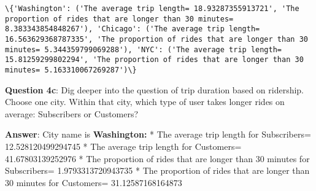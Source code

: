 \documentclass[11pt]{article}
\begin{document}
    \begin{Verbatim}[commandchars=\\\{\}]
\{'Washington': ('The average trip length= 18.93287355913721', 'The proportion of rides that are longer than 30 minutes= 8.383343854848267'), 'Chicago': ('The average trip length= 16.563629368787335', 'The proportion of rides that are longer than 30 minutes= 5.344359799069288'), 'NYC': ('The average trip length= 15.81259299802294', 'The proportion of rides that are longer than 30 minutes= 5.163310067269287')\}

    \end{Verbatim}

    \textbf{Question 4c}: Dig deeper into the question of trip duration
based on ridership. Choose one city. Within that city, which type of
user takes longer rides on average: Subscribers or Customers?

\textbf{Answer}: City name is \textbf{Washington:} * The average trip
length for Subscribers= 12.528120499294745 * The average trip length for
Customers= 41.67803139252976 * The proportion of rides that are longer
than 30 minutes for Subscribers= 1.9793313720943735 * The proportion of
rides that are longer than 30 minutes for Customers= 31.12587168164873
\end{document}
